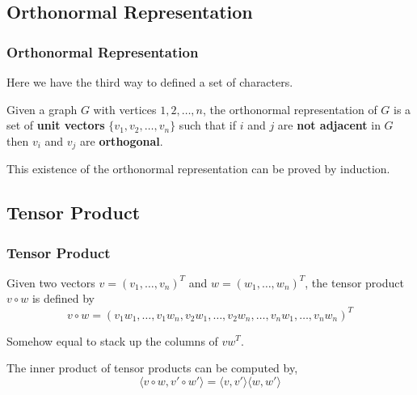 \subsection{Orthonormal Representation}

      \begin{frame}
            \frametitle{Orthonormal Representation}

            Here we have the third way to defined a set of characters.

            \begin{definition}\label{def:orthonormalRepresentation}
                  Given a graph $ G $ with vertices $ 1,2,\dots,n $, the orthonormal representation of $ G $ is a set of \textbf{unit vectors} $ \{v_1, v_2, \dots, v_n\} $ such that if $ i $ and $ j $ are \textbf{not adjacent} in $ G $ then $ v_i $ and $ v_j $ are \textbf{orthogonal}.
            \end{definition}

            \pause

            This existence of the orthonormal representation can be proved by induction.

      \end{frame}

\subsection{Tensor Product}

      \begin{frame}
            \frametitle{Tensor Product}
            \begin{definition}\label{def:tensorProduct}
                  Given two vectors $ v = \left(v_{1},\dots,v_{n}\right)^{T} $ and $ w = \left(w_{1},\dots,w_{n}\right)^{T} $, the tensor product $ v \circ w $ is defined by
                  \begin{equation}
                        v \circ w = \left(
                              v_{1}w_{1},\dots,v_{1}w_{n},
                              v_{2}w_{1},\dots,v_{2}w_{n},
                              \dots,
                              v_{n}w_{1},\dots,v_{n}w_{n}
                              \right)^{T}
                  \end{equation}

                  Somehow equal to stack up the columns of $ v w^{T} $.
            \end{definition}

            \pause

            \begin{lemma}
                  The inner product of tensor products can be computed by,
                  \begin{equation}
                        \langle v \circ w, v' \circ w' \rangle = \langle v, v' \rangle \langle w, w' \rangle
                  \end{equation}
            \end{lemma}

      \end{frame}

